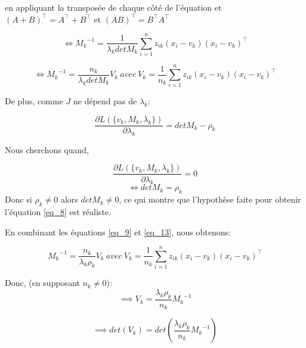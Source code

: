 \documentclass[a4paper,11pt,oneside,roman]{article}
\begin{document}
    en appliquant la transposée de chaque côté de l'équation et $(A+B)^\top = A^\top + B^\top$ et $(AB)^\top = B^\top A^\top$

    \begin{equation}
        \iff {M_k}^{-1} = \frac{1}{\lambda_k det M_k }\sum^{n}_{i=1} z_{ik} (x_i-v_k)(x_i-v_k)^\top
    \end{equation}

    \begin{equation}
        \iff {M_k}^{-1} = \frac{n_k}{\lambda_k det M_k }V_k \ avec \ V_k = \frac{1}{n_k}\sum^{n}_{i=1} z_{ik} (x_i-v_k)(x_i-v_k)^\top
        \label{eq_9}
    \end{equation}

    De plus, comme $J$ ne dépend pas de $\lambda_k$:

    \begin{equation}
        \frac{\partial L(\{v_k, M_k, \lambda_k\})}{\partial \lambda_k} = detM_k - \rho_k
    \end{equation}
    
    Nous cherchons quand,

    \begin{equation}
        \frac{\partial L(\{v_k, M_k, \lambda_k\})}{\partial \lambda_k} = 0
    \end{equation}
    \begin{equation}
        \iff detM_k = \rho_k
        \label{eq_13}
    \end{equation}
    Donc si $\rho_k \neq 0$ alors $det M_k \neq 0$, ce qui montre que l'hypothèse faite pour obtenir l'équation \ref{eq_8} est réaliste.

    En combinant les équations \ref{eq_9} et \ref{eq_13}, nous obtenons:

    \begin{equation}
        {M_k}^{-1} = \frac{n_k}{\lambda_k \rho_k }V_k \ avec \ V_k = \frac{1}{n_k}\sum^{n}_{i=1} z_{ik} (x_i-v_k)(x_i-v_k)^\top
        \label{eq_14}
    \end{equation}

    Donc, (en supposant $n_k \neq 0$):
    \begin{equation}
        \implies V_k = \frac{\lambda_k \rho_k}{n_k} {M_k}^{-1}
    \end{equation}

    \begin{equation}
        \implies det(V_k) = det(\frac{\lambda_k \rho_k}{n_k} {M_k}^{-1})
    \end{equation}
\end{document}
